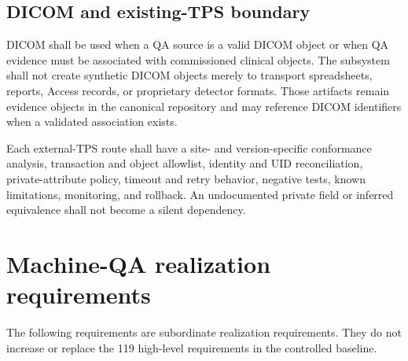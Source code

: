 \documentclass[11pt,letterpaper]{article}
\begin{document}
\subsection{DICOM and existing-TPS boundary}

DICOM shall be used when a QA source is a valid DICOM object or when QA evidence must be associated with commissioned clinical objects. The subsystem shall not create synthetic DICOM objects merely to transport spreadsheets, reports, Access records, or proprietary detector formats. Those artifacts remain evidence objects in the canonical repository and may reference DICOM identifiers when a validated association exists.

Each external-TPS route shall have a site- and version-specific conformance analysis, transaction and object allowlist, identity and UID reconciliation, private-attribute policy, timeout and retry behavior, negative tests, known limitations, monitoring, and rollback. An undocumented private field or inferred equivalence shall not become a silent dependency.

\section{Machine-QA realization requirements}

The following requirements are subordinate realization requirements. They do not increase or replace the 119 high-level requirements in the controlled baseline.
\end{document}
